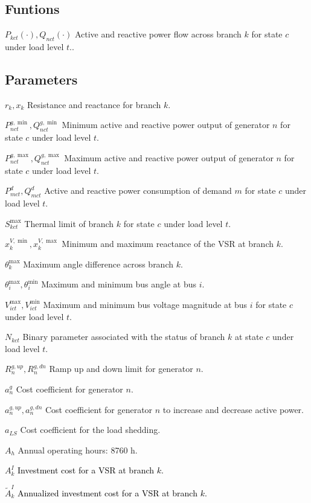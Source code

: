 \documentclass[journal]{IEEEtran}
\begin{document}
\subsection*{Funtions}
\begin{IEEEdescription}
	\item[$P_{kct}(\cdot),Q_{nct}(\cdot)$] Active and reactive power flow across branch $k$ for state $c$ under load level $t$..
\end{IEEEdescription} 

\subsection*{Parameters}
\begin{IEEEdescription}
	\item[$r_k,x_{k}$] Resistance and reactance for branch $k$.
	\item[$P^{g,\min}_{nct},Q^{g,\min}_{nct}$] Minimum active and reactive power output of generator $n$ for state $c$ under load level $t$.
	\item[$P^{g,\max}_{nct},Q^{g,\max}_{nct}$] Maximum active and reactive power output of generator $n$ for state $c$ under load level $t$.
	\item[$P_{mct}^d,Q_{mct}^d$]  Active and reactive power consumption of demand $m$ for state $c$ under load level $t$.
	\item[$S_{kct}^{\max}$] Thermal limit of branch  $k$ for state $c$ under load level $t$. 
	\item[$x_{k}^{V,\min},x_{k}^{V,\max}$] Minimum and maximum reactance of the VSR at branch $k$.
	\item[$\theta_{k}^{\max}$] Maximum angle difference across branch $k$.
	\item[$\theta_{i}^{\max},\theta_{i}^{\min}$] Maximum and minimum bus angle at bus $i$.
	\item[$V_{ict}^{\max},V_{ict}^{\min}$] Maximum and minimum bus voltage magnitude at bus $i$ for state $c$ under load level $t$.
	\item[$N_{kct}$] Binary parameter associated with the status of branch $k$ at state $c$ under load level $t$.
	
	\item[$R^{g,up}_n,R^{g,dn}_n$] Ramp up and down limit for generator $n$.
	\item[$a_n^g$] Cost coefficient for generator $n$.
	\item[$a_n^{g,up},a_n^{g,dn}$] Cost coefficient for generator $n$ to increase and decrease active power.
	\item[$a_{LS}$] Cost coefficient for the load shedding.
	\item[$A_h$] Annual operating hours: 8760 h.
	\item[$A^I_k$] \textcolor{black}{Investment cost for a VSR at branch $k$.}
	\item[$\tilde{A}^I_k$] \textcolor{black}{Annualized investment cost for a VSR at branch $k$.}
\end{IEEEdescription} 
\end{document}

